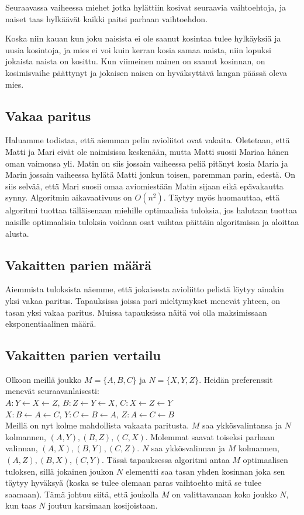 \documentclass[finnish]{tktltiki2}
\theoremstyle{definition}
\theoremstyle{remark}
\begin{document}
Seuraavassa vaiheessa miehet jotka hylättiin kosivat seuraavia vaihtoehtoja, ja naiset taas hylkäävät kaikki paitsi parhaan vaihtoehdon.

Koska niin kauan kun joku naisista ei ole saanut kosintaa tulee hylkäyksiä ja uusia kosintoja, ja mies ei voi kuin kerran kosia samaa naista, niin lopuksi jokaista naista on kosittu. Kun viimeinen nainen on saanut kosinnan, on kosimisvaihe päättynyt ja jokaisen naisen on hyväksyttävä langan päässä oleva mies. \cite[p. 12-13]{gale62a}

\subsection{Vakaa paritus}
Haluamme todistaa, että aiemman pelin avioliitot ovat vakaita.
Oletetaan, että Matti ja Mari eivät ole naimisissa keskenään, mutta Matti suosii Mariaa hänen oman vaimonsa yli. Matin on siis jossain vaiheessa peliä pitänyt kosia Maria ja Marin jossain vaiheessa hylätä Matti jonkun toisen, paremman parin, edestä. On siis selvää, että Mari suosii omaa aviomiestään Matin sijaan eikä epävakautta synny. \cite[p. 13]{gale62a} Algoritmin aikavaativuus on $O(n^2)$. Täytyy myös huomauttaa, että algoritmi tuottaa tälläisenaan miehille optimaalisia tuloksia, jos halutaan tuottaa naisille optimaalisia tuloksia voidaan osat vaihtaa päittäin algoritmissa ja aloittaa alusta.

\subsection{Vakaitten parien määrä}
Aiemmista tuloksista näemme, että jokaisesta avioliitto pelistä löytyy ainakin yksi vakaa paritus. Tapauksissa joissa pari mieltymykset menevät yhteen, on tasan yksi vakaa paritus. Muissa tapauksissa näitä voi olla maksimissaan eksponentiaalinen määrä. \cite[p. 591]{Balinski}

\subsection{Vakaitten parien vertailu}
Olkoon meillä joukko $M = \{A, B, C\}$ ja $N = \{X, Y, Z\}$. Heidän preferenssit menevät seuraavanlaisesti:\\
$A: Y \leftarrow X \leftarrow Z$, $B: Z \leftarrow Y \leftarrow X$, $C: X \leftarrow Z \leftarrow Y$ \\
$X: B \leftarrow A \leftarrow C$, $Y: C \leftarrow B \leftarrow A$, $Z: A \leftarrow C \leftarrow B$ \\
Meillä on nyt kolme mahdollista vakaata paritusta. $M$ saa ykkösvalintansa ja $N$ kolmannen, $(A, Y), (B, Z), (C, X)$. Molemmat saavat toiseksi parhaan valinnan, $(A, X), (B, Y), (C, Z)$. $N$ saa ykkösvalinnan ja $M$ kolmannen, $(A, Z), (B, X), (C, Y)$. Tässä tapauksessa algoritmi antaa $M$ optimaalisen tuloksen, sillä jokainen joukon $N$ elementti saa tasan yhden kosinnan joka sen täytyy hyväksyä (koska se tulee olemaan paras vaihtoehto mitä se tulee saamaan). Tämä johtuu siitä, että joukolla $M$ on valittavanaan koko joukko $N$, kun taas $N$ joutuu karsimaan kosijoistaan.
\end{document}
